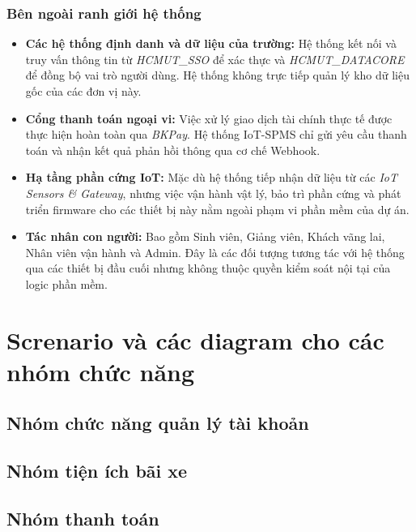 \documentclass[a4paper,12pt]{article}
\begin{document}
\subsubsection{Bên ngoài ranh giới hệ thống}
\begin{itemize}
    \item \textbf{Các hệ thống định danh và dữ liệu của trường:} Hệ thống kết nối và truy vấn thông tin từ \textit{HCMUT\_SSO} để xác thực và \textit{HCMUT\_DATACORE} để đồng bộ vai trò người dùng. Hệ thống không trực tiếp quản lý kho dữ liệu gốc của các đơn vị này.
    \item \textbf{Cổng thanh toán ngoại vi:} Việc xử lý giao dịch tài chính thực tế được thực hiện hoàn toàn qua \textit{BKPay}. Hệ thống IoT-SPMS chỉ gửi yêu cầu thanh toán và nhận kết quả phản hồi thông qua cơ chế Webhook.
    \item \textbf{Hạ tầng phần cứng IoT:} Mặc dù hệ thống tiếp nhận dữ liệu từ các \textit{IoT Sensors \& Gateway}, nhưng việc vận hành vật lý, bảo trì phần cứng và phát triển firmware cho các thiết bị này nằm ngoài phạm vi phần mềm của dự án.
    \item \textbf{Tác nhân con người:} Bao gồm Sinh viên, Giảng viên, Khách vãng lai, Nhân viên vận hành và Admin. Đây là các đối tượng tương tác với hệ thống qua các thiết bị đầu cuối nhưng không thuộc quyền kiểm soát nội tại của logic phần mềm.
\end{itemize}

\section{Screnario và các diagram cho các nhóm chức năng}
\vspace{-0.5cm}
\subsection{Nhóm chức năng quản lý tài khoản}


\subsection{Nhóm tiện ích bãi xe}


\subsection{Nhóm thanh toán}

\end{document}
